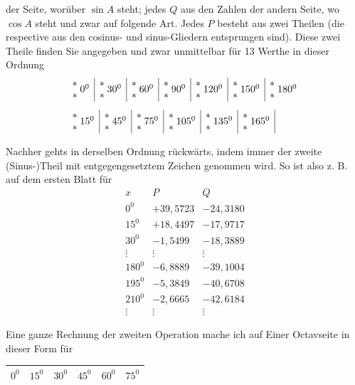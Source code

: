 \begin{landscape}
der Seite, worüber \(\sin A\) steht; jedes \(Q\) aus den Zahlen der andern Seite,
wo \(\cos A\) steht und zwar auf folgende Art. Jedes \(P\) besteht aus zwei Theilen
(die respective aus den cosinus- und sinus-Gliedern entsprungen sind). Diese
zwei Theile finden Sie angegeben und zwar unmittelbar für 13 Werthe in
dieser Ordnung
\providecommand{\VIIthreeStars}[1]{\begin{array}{@{}c@{}}\ast\\\ast\end{array}\;#1}
\begingroup\small
\[
\begin{aligned}
&\begin{array}{c|c|c|c|c|c|c}
\VIIthreeStars{0^0}&\VIIthreeStars{30^0}&\VIIthreeStars{60^0}&\VIIthreeStars{90^0}&\VIIthreeStars{120^0}&\VIIthreeStars{150^0}&\VIIthreeStars{180^0}
\end{array}\\[1ex]
&\begin{array}{c|c|c|c|c|c|}
\VIIthreeStars{15^0}&\VIIthreeStars{45^0}&\VIIthreeStars{75^0}&\VIIthreeStars{105^0}&\VIIthreeStars{135^0}&\VIIthreeStars{165^0}
\end{array}
\end{aligned}
\]
\endgroup
\par\noindent\hspace*{\parindent}Nachher gehts in derselben Ordnung rückwärts, indem immer der zweite
(Sinus-)Theil mit entgegengesetztem Zeichen genommen wird. So ist also z. B.
auf dem ersten Blatt für
\[
\begin{array}{r|r|r}
x&P&Q\\
0^0&+39{,}5723&-24{,}3180\\
15^0&+18{,}4497&-17{,}9717\\
30^0&-1{,}5499&-18{,}3889\\
\vdots&\vdots&\vdots\\
180^0&-6{,}8889&-39{,}1004\\
195^0&-5{,}3849&-40{,}6708\\
210^0&-2{,}6665&-42{,}6184\\
\vdots&\vdots&\vdots
\end{array}
\]
\par\noindent Eine ganze Rechnung der zweiten Operation mache ich auf Einer Octavseite
in dieser Form für
\begingroup\renewcommand{\arraystretch}{1.8}\setlength{\tabcolsep}{13pt}
\begin{center}
\begin{tabular}{|c|c|c|c|c|c|}
\hline
\(0^0\)&\(15^0\)&\(30^0\)&\(45^0\)&\(60^0\)&\(75^0\)\\\hline

\end{tabular}
\end{center}
\end{landscape}
